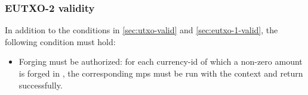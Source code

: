 \subsubsection{EUTXO-2 validity}
\label{sec:eutxo-2-valid}

In addition to the conditions in \cref{sec:utxo-valid} and \cref{sec:eutxo-1-valid}, the following condition must hold:
\begin{itemize}
\item Forging must be authorized: for each \gls{currency-id} of which a non-zero amount is forged in , the corresponding \gls{mps} must be run with the \gls{context} and return successfully.
\end{itemize}
